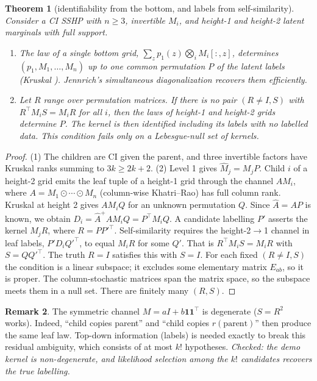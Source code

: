 \documentclass[11pt]{article}
\newtheorem{theorem}{Theorem}[section]
\theoremstyle{definition}
\newtheorem{remark}[theorem]{Remark}
\begin{document}
\begin{theorem}[identifiability from the bottom, and labels from self-similarity]\label{thm:ident}
Consider a CI SSHP with $n\ge3$, invertible $M_i$, and height-1 and height-2 latent marginals
with full support.
\begin{enumerate}
\item The law of a \emph{single bottom grid}, $\sum_zp_1(z)\bigotimes_iM_i[:,z]$, determines
$(p_1,M_1,\dots,M_n)$ up to one common permutation $P$ of the latent labels
(Kruskal \cite{kruskal1977,allman2009}). Jennrich's simultaneous diagonalization recovers them
efficiently.
\item Let $R$ range over permutation matrices. If there is no pair $(R\ne I,S)$ with
$R^\top M_iS=M_iR$ for all $i$, then the laws of height-1 and height-2 grids determine $P$.
The kernel is then identified \emph{including its labels} with no labelled data. This condition
fails only on a Lebesgue-null set of kernels.
\end{enumerate}
\end{theorem}
\begin{proof}
(1) The children are CI given the parent, and three invertible factors have Kruskal ranks
summing to $3k\ge2k+2$.
(2) Level 1 gives $\hat M_j=M_jP$. Child $i$ of a height-2 grid emits the leaf tuple of a
height-1 grid through the channel $A M_i$, where $A=M_1\odot\cdots\odot M_n$ (column-wise
Khatri--Rao) has full column rank. Kruskal at height 2 gives $AM_iQ$ for an unknown
permutation $Q$. Since $\hat A=AP$ is known, we obtain $D_i=\hat A^{+}AM_iQ=P^\top M_iQ$.
A candidate labelling $P'$ asserts the kernel $M_jR$, where $R=PP'^\top$. Self-similarity
requires the height-2$\to$1 channel in leaf labels, $P'D_iQ'^\top$, to equal $M_iR$ for some
$Q'$. That is $R^\top M_iS=M_iR$ with $S=QQ'^\top$. The truth $R=I$ satisfies this with $S=I$.
For each fixed $(R\ne I,S)$ the condition is a linear subspace; it excludes some elementary
matrix $E_{ab}$, so it is proper. The column-stochastic matrices span the matrix space, so the
subspace meets them in a null set. There are finitely many $(R,S)$.
\end{proof}
\begin{remark}
The symmetric channel $M=aI+b\mathbf 1\mathbf 1^\top$ is degenerate ($S=R^2$ works). Indeed,
``child copies parent'' and ``child copies $r(\text{parent})$'' then produce the same leaf law.
Top-down information (labels) is needed exactly to break this residual ambiguity, which consists
of at most $k!$ hypotheses. \emph{Checked: the demo kernel is non-degenerate, and
likelihood selection among the $k!$ candidates recovers the true labelling.}
\end{remark}
\end{document}
